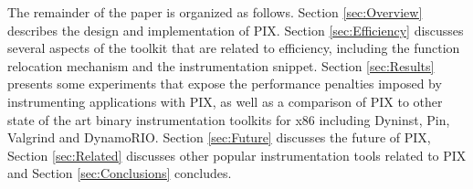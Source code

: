 The remainder of the paper is organized as follows. Section
\ref{sec:Overview} describes the design and implementation of PIX.
Section \ref{sec:Efficiency} discusses
several aspects of the toolkit that are related to efficiency, including the function relocation mechanism and the
instrumentation snippet. Section \ref{sec:Results} presents some
experiments that expose the performance penalties imposed by instrumenting applications with PIX, as well as
a comparison of PIX to other state of the art binary instrumentation toolkits for x86 including Dyninst, Pin, Valgrind and DynamoRIO. Section
\ref{sec:Future} discusses the future of PIX, Section \ref{sec:Related} discusses 
other popular instrumentation tools related to PIX and Section \ref{sec:Conclusions} concludes.
